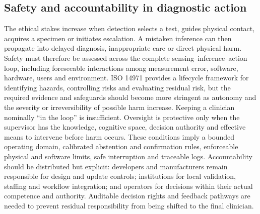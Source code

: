 \documentclass[12pt,a4paper]{article}
\begin{document}
\subsection{Safety and accountability in diagnostic action}
\label{subsec:safety_accountability}
The ethical stakes increase when detection selects a test, guides physical contact, acquires a specimen or initiates escalation. A mistaken inference can then propagate into delayed diagnosis, inappropriate care or direct physical harm. Safety must therefore be assessed across the complete sensing--inference--action loop, including foreseeable interactions among measurement error, software, hardware, users and environment. ISO 14971 provides a lifecycle framework for identifying hazards, controlling risks and evaluating residual risk, but the required evidence and safeguards should become more stringent as autonomy and the severity or irreversibility of possible harm increase. Keeping a clinician nominally ``in the loop'' is insufficient. Oversight is protective only when the supervisor has the knowledge, cognitive space, decision authority and effective means to intervene before harm occurs. These conditions imply a bounded operating domain, calibrated abstention and confirmation rules, enforceable physical and software limits, safe interruption and traceable logs. Accountability should be distributed but explicit: developers and manufacturers remain responsible for design and update controls; institutions for local validation, staffing and workflow integration; and operators for decisions within their actual competence and authority. Auditable decision rights and feedback pathways are needed to prevent residual responsibility from being shifted to the final clinician.
\end{document}
